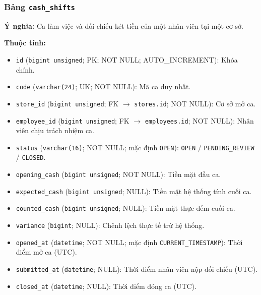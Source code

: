 \subsubsection{Bảng \texttt{cash\_shifts}}

\textbf{Ý nghĩa:} Ca làm việc và đối chiếu két tiền của một nhân viên tại một cơ sở.\par

\textbf{Thuộc tính:}

\begin{itemize}

\item \texttt{id} (\texttt{bigint unsigned}; PK; NOT NULL; AUTO_INCREMENT): Khóa chính.

\item \texttt{code} (\texttt{varchar(24)}; UK; NOT NULL): Mã ca duy nhất.

\item \texttt{store\_id} (\texttt{bigint unsigned}; FK $\rightarrow$ \texttt{stores.id}; NOT NULL): Cơ sở mở ca.

\item \texttt{employee\_id} (\texttt{bigint unsigned}; FK $\rightarrow$ \texttt{employees.id}; NOT NULL): Nhân viên chịu trách nhiệm ca.

\item \texttt{status} (\texttt{varchar(16)}; NOT NULL; mặc định \texttt{OPEN}): \texttt{OPEN} / \texttt{PENDING\_REVIEW} / \texttt{CLOSED}.

\item \texttt{opening\_cash} (\texttt{bigint unsigned}; NOT NULL): Tiền mặt đầu ca.

\item \texttt{expected\_cash} (\texttt{bigint unsigned}; NULL): Tiền mặt hệ thống tính cuối ca.

\item \texttt{counted\_cash} (\texttt{bigint unsigned}; NULL): Tiền mặt thực đếm cuối ca.

\item \texttt{variance} (\texttt{bigint}; NULL): Chênh lệch thực tế trừ hệ thống.

\item \texttt{opened\_at} (\texttt{datetime}; NOT NULL; mặc định \texttt{CURRENT\_TIMESTAMP}): Thời điểm mở ca (UTC).

\item \texttt{submitted\_at} (\texttt{datetime}; NULL): Thời điểm nhân viên nộp đối chiếu (UTC).

\item \texttt{closed\_at} (\texttt{datetime}; NULL): Thời điểm đóng ca (UTC).


\end{itemize}
